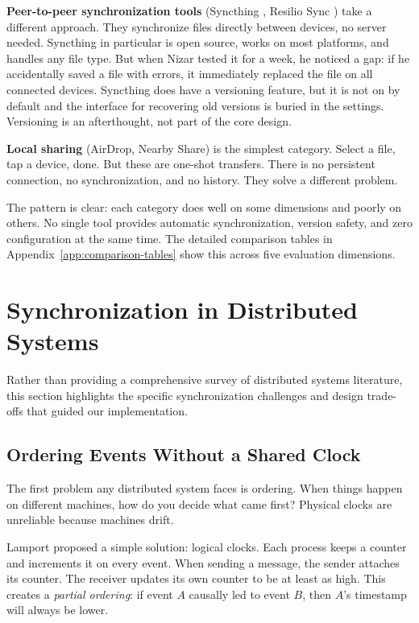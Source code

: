\textbf{Peer-to-peer synchronization tools} (Syncthing \cite{syncthing}, Resilio Sync \cite{resilio}) take a different approach. They synchronize files directly between devices, no server needed. Syncthing in particular is open source, works on most platforms, and handles any file type. But when Nizar tested it for a week, he noticed a gap: if he accidentally saved a file with errors, it immediately replaced the file on all connected devices. Syncthing does have a versioning feature, but it is not on by default and the interface for recovering old versions is buried in the settings. Versioning is an afterthought, not part of the core design.

\textbf{Local sharing} (AirDrop, Nearby Share) is the simplest category. Select a file, tap a device, done. But these are one-shot transfers. There is no persistent connection, no synchronization, and no history. They solve a different problem.

The pattern is clear: each category does well on some dimensions and poorly on others. No single tool provides automatic synchronization, version safety, and zero configuration at the same time. The detailed comparison tables in Appendix~\ref{app:comparison-tables} show this across five evaluation dimensions.

\section{Synchronization in Distributed Systems}

Rather than providing a comprehensive survey of distributed systems literature, this section highlights the specific synchronization challenges and design trade-offs that guided our implementation.

\subsection{Ordering Events Without a Shared Clock}

The first problem any distributed system faces is ordering. When things happen on different machines, how do you decide what came first? Physical clocks are unreliable because machines drift.

Lamport \citeyear{lamport1978} proposed a simple solution: logical clocks. Each process keeps a counter and increments it on every event. When sending a message, the sender attaches its counter. The receiver updates its own counter to be at least as high. This creates a \emph{partial ordering}: if event $A$ causally led to event $B$, then $A$'s timestamp will always be lower.

